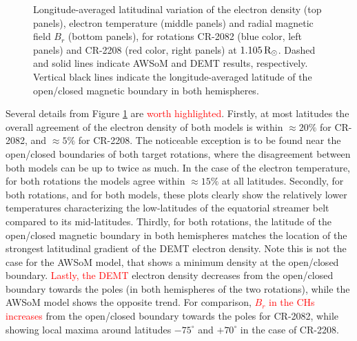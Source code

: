 \documentclass[namedreferences]{solarphysics}
\def\edit#1{\textcolor{Red}{#1}}
\newcommand{\mdeg}{^\circ}
\newcommand{\mrsun}{{\rm R_\odot}}
\begin{document}
\begin{article}
\begin{figure}[h!]
\begin{center}
\caption{Longitude-averaged latitudinal variation of the electron density ({top panels}), {electron temperature ({middle panels})} and {radial magnetic field $B_r$ (bottom panels), for rotations} CR-2082 ({blue color, left panels}) and CR-2208 ({red color, right panels) at} $1.105\,\mrsun$. Dashed and solid lines indicate AWSoM and DEMT results, respectively. Vertical black lines indicate the longitude-averaged latitude of the open/closed magnetic boundary in both hemispheres.}
\label{perf_lat}
\end{center}
\end{figure}

{Several details from Figure \ref{perf_lat} are \edit{worth highlighted}. Firstly, at most latitudes the overall agreement of the electron density of both models is within $\approx 20\%$ for CR-2082, and $\approx 5\%$ for CR-2208. The noticeable exception is to be found near the open/closed boundaries of both target rotations, where the disagreement between both models can be up to twice as much. In the case of the electron temperature, for both rotations the models agree within $\approx 15\%$ at all latitudes. Secondly, for both rotations, and for both models, these plots clearly show the relatively lower temperatures characterizing the low-latitudes of the equatorial streamer belt compared to its mid-latitudes. Thirdly, for both rotations, the latitude of the open/closed magnetic boundary in both hemispheres matches the location of the strongest latitudinal gradient of the DEMT electron density. Note this is not the case for the AWSoM model, that shows a minimum density at the open/closed boundary. \edit{Lastly, the DEMT} electron density decreases from the open/closed boundary towards the poles (in both hemispheres of the two rotations), while the AWSoM model shows the opposite trend. {For comparison, \edit{$B_r$ in the CHs increases} from the open/closed boundary towards the poles for CR-2082, while showing local maxima around latitudes $-75\mdeg$ and $+70\mdeg$ in the case of CR-2208.}}


\end{article}
\end{document}
